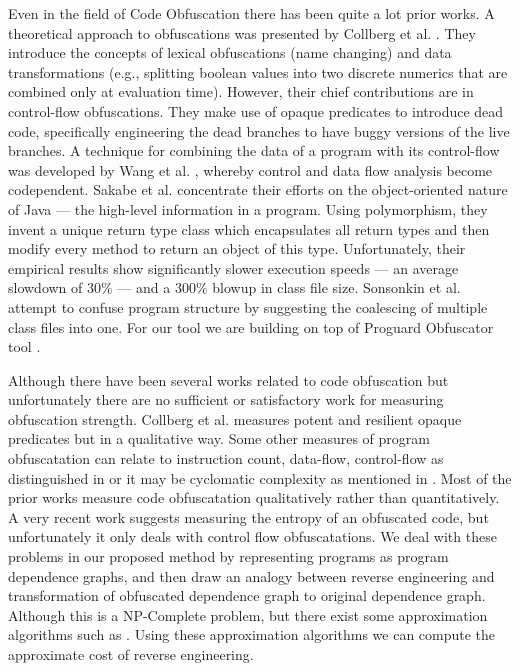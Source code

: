 \documentclass[twocolumn]{article}
\begin{document}
Even in the field of Code Obfuscation there has been quite a lot prior works. A theoretical approach to obfuscations was presented by Collberg et al. \cite{collberg}. They introduce 
the concepts of lexical obfuscations (name changing) and data transformations (e.g., splitting boolean values into two discrete numerics that are combined only at evaluation time). 
However, their chief contributions are in control-flow obfuscations. They make use of opaque predicates to introduce dead code, specifically engineering the dead branches to have buggy 
versions of the live branches. A technique for combining the data of a program with its control-flow was developed by Wang et al. \cite{wang}, whereby control and data flow analysis become 
codependent. Sakabe et al. \cite{sakabe} concentrate their efforts on the object-oriented nature of Java — the high-level information in a program. Using polymorphism, they invent a 
unique return type class which encapsulates all return types and then modify every method to return an object of this type. Unfortunately, their empirical results show significantly 
slower execution speeds — an average slowdown of $30\%$ — and a $300\%$ blowup in class file size. Sonsonkin et al. \cite{sonsonkin} attempt to confuse program structure by suggesting the coalescing of 
multiple class files into one. For our tool we are building on top of Proguard Obfuscator tool \cite{proguard}.

Although there have been several works related to code obfuscation but unfortunately there are no sufficient or satisfactory work for measuring obfuscation strength. Collberg et al. 
\cite{collberg} measures potent and resilient opaque predicates but in a qualitative way. Some other measures of program obfuscatation can relate to instruction count, data-flow, 
control-flow as distinguished in \cite{sutter} or it may be cyclomatic complexity as mentioned in \cite{McCabe}. Most of the prior works measure code obfuscatation qualitatively rather 
than quantitatively. A very recent work \cite{entropy} suggests measuring the entropy of an obfuscated code, but unfortunately it only deals with control flow obfuscatations. We deal 
with these problems in our proposed method by representing programs as program dependence graphs, and then draw an analogy between reverse engineering and transformation of obfuscated 
dependence graph to original dependence graph. Although this is a NP-Complete problem, but there exist some approximation algorithms such as \cite{Demaine05}. Using these approximation 
algorithms we can compute the approximate cost of reverse engineering.
\end{document}
